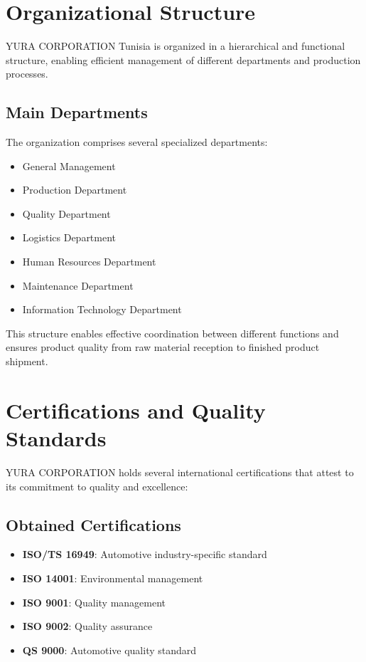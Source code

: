 \section{Organizational Structure}

YURA CORPORATION Tunisia is organized in a hierarchical and functional structure, enabling efficient management of different departments and production processes.

\subsection{Main Departments}

The organization comprises several specialized departments:
\begin{itemize}
    \item General Management
    \item Production Department
    \item Quality Department
    \item Logistics Department
    \item Human Resources Department
    \item Maintenance Department
    \item Information Technology Department
\end{itemize}

This structure enables effective coordination between different functions and ensures product quality from raw material reception to finished product shipment.

\section{Certifications and Quality Standards}

YURA CORPORATION holds several international certifications that attest to its commitment to quality and excellence:

\subsection{Obtained Certifications}

\begin{itemize}
    \item \textbf{ISO/TS 16949}: Automotive industry-specific standard
    \item \textbf{ISO 14001}: Environmental management
    \item \textbf{ISO 9001}: Quality management
    \item \textbf{ISO 9002}: Quality assurance
    \item \textbf{QS 9000}: Automotive quality standard
\end{itemize}

